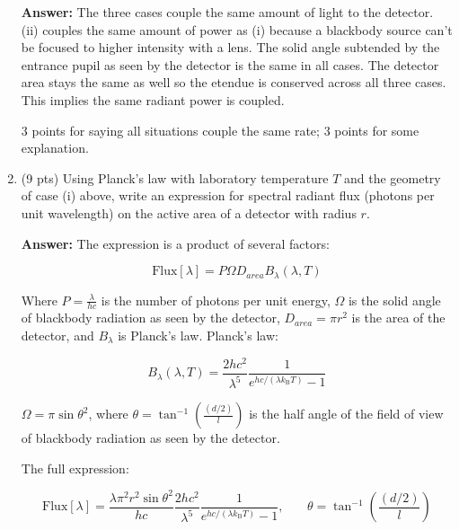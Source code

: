 \documentclass[12pt]{caltech_thesis}
\begin{document}
\begin{enumerate}
  {\color{midnightblue}  \textbf{Answer:} } {\color{midnightblue}  The
  three cases couple the same amount of light to the detector. (ii)
  couples the same amount of power as (i) because a blackbody source
  can't be focused to higher intensity with a lens. The solid angle
  subtended by the entrance pupil as seen by the detector is the same in
  all cases. The detector area stays the same as well so the etendue is
  conserved across all three cases. This implies the same radiant power
  is coupled. }

  {\color{darkred}  3 points for saying all situations couple the same
  rate; 3 points for some explanation. }
\item
  (9 pts) Using Planck's law with laboratory temperature \(T\) and the
  geometry of case (i) above, write an expression for spectral radiant
  flux (photons per unit wavelength) on the active area of a detector
  with radius \(r\).

  {\color{midnightblue}  \textbf{Answer:} } {\color{midnightblue} The
  expression is a product of several factors:}

  {\color{midnightblue} 

  \[\text{Flux}[\lambda] = P \Omega D_{area} B_{\lambda}(\lambda, T)\]

  }

  {\color{midnightblue}  Where \(P = \frac{\lambda}{hc}\) is the number
  of photons per unit energy, \(\Omega\) is the solid angle of blackbody
  radiation as seen by the detector, \(D_{area} = \pi r^2\) is the area
  of the detector, and \(B_{\lambda}\) is Planck's law. }
  {\color{midnightblue} Planck's law:}

  {\color{midnightblue} 

  \[B_{\lambda}(\lambda, T)=\frac{2 h c^{2}}{\lambda^{5}} \frac{1}{e^{h c /\left(\lambda k_{\mathrm{B}} T\right)}-1}\]

  }

  {\color{midnightblue}  \(\Omega = \pi \sin{\theta^2}\), where
  \(\theta = \tan^{-1}(\frac{(d/2)}{l})\) is the half angle of the field
  of view of blackbody radiation as seen by the detector. }

  {\color{midnightblue} The full expression: }

  {\color{midnightblue} 

  \[\text{Flux}[\lambda] = \frac{\lambda \pi^2 r^2 \sin{\theta^2}}{hc} \frac{2 h c^{2}}{\lambda^{5}} \frac{1}{e^{h c /\left(\lambda k_{\mathrm{B}} T\right)}-1}, \,\,\,\,\,\,\,\,\,\,\,\theta = \tan^{-1}(\frac{(d/2)}{l})\]

}
\end{enumerate}
\end{document}
